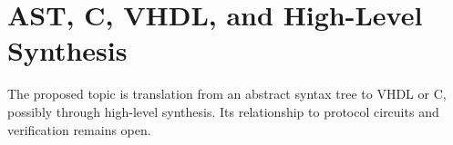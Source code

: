 \chapter{AST, C, VHDL, and High-Level Synthesis}
\label{app:ast-hls}


The proposed topic is translation from an abstract syntax tree to VHDL or C,
possibly through high-level synthesis. Its relationship to protocol circuits
and verification remains open.
